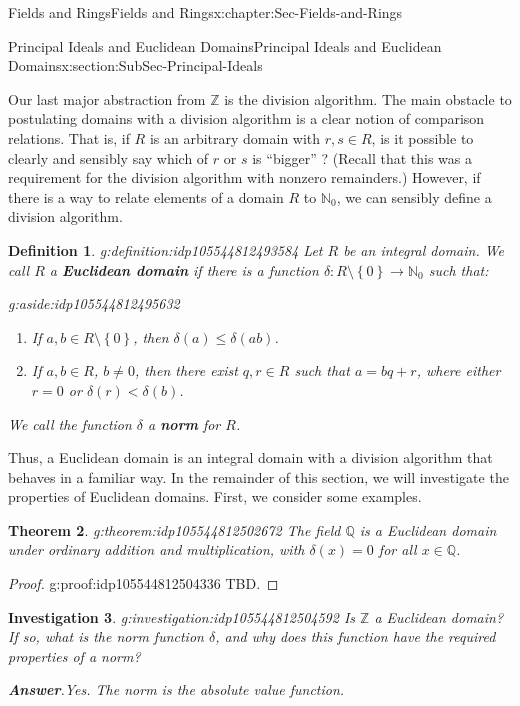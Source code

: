 \documentclass[oneside,10pt,]{book}
\newcommand{\blocktitlefont}{\relax}
\newcommand{\terminology}[1]{\textbf{#1}}
\numberwithin{equation}{section}
\renewcommand{\le}{\leqslant}
\newcommand{\set}[1]{\left\{ {#1} \right\}}
\def\Z{{\mathbb Z}}
\def\Q{{\mathbb Q}}
\def\N{{\mathbb N}}
\newtheorem{theorem}{Theorem}[section]
\newtheorem{definition}[theorem]{Definition}
\newtheorem{investigation}[theorem]{Investigation}
\newcommand{\lt}{<}
\begin{document}
\begin{chapterptx}{Fields and Rings}{}{Fields and Rings}{}{}{x:chapter:Sec-Fields-and-Rings}
\begin{sectionptx}{Principal Ideals and Euclidean Domains}{}{Principal Ideals and Euclidean Domains}{}{}{x:section:SubSec-Principal-Ideals}
\par
Our last major abstraction from \(\Z\) is the division algorithm. The main obstacle to postulating domains with a division algorithm is a clear notion of comparison relations. That is, if \(R\) is an arbitrary domain with \(r,s\in R\), is it possible to clearly and sensibly say which of \(r\) or \(s\) is ``bigger'' ? (Recall that this was a requirement for the division algorithm with nonzero remainders.) However, if there is a way to relate elements of a domain \(R\) to \(\N_0\), we can sensibly define a division algorithm.%
\begin{definition}{}{g:definition:idp105544812493584}%
Let \(R\) be an integral domain. We call \(R\) a \terminology{Euclidean domain} if there is a function \(\delta : R\setminus \set{0} \to \N_0\) such that: \begin{aside}{}{g:aside:idp105544812495632}%
\end{aside}
%
\begin{enumerate}
\item{}If \(a,b\in R\setminus \set{0}\), then \(\delta(a) \le \delta(ab)\).%
\item{}If \(a,b\in R\), \(b\ne 0\), then there exist \(q,r\in R\) such that \(a = bq+r\), where either \(r = 0\) or \(\delta(r) \lt \delta(b)\).%
\end{enumerate}
%
\par
We call the function \(\delta\) a \terminology{norm} for \(R\).%
\end{definition}
Thus, a Euclidean domain is an integral domain with a division algorithm that behaves in a familiar way. In the remainder of this section, we will investigate the properties of Euclidean domains. First, we consider some examples.%
\begin{theorem}{}{}{g:theorem:idp105544812502672}%
The field \(\Q\) is a Euclidean domain under ordinary addition and multiplication, with \(\delta(x) = 0\) for all \(x\in \Q\).%
\end{theorem}
\begin{proof}{}{g:proof:idp105544812504336}
TBD.\end{proof}
\begin{investigation}{}{g:investigation:idp105544812504592}%
Is \(\Z\) a Euclidean domain? If so, what is the norm function \(\delta\), and why does this function have the required properties of a norm?%
\par\smallskip%
\noindent\textbf{\blocktitlefont Answer}.\hypertarget{g:answer:idp105544812506128}{}\quad{}Yes. The norm is the absolute value function.%

\end{investigation}
\end{sectionptx}
\end{chapterptx}
\end{document}
